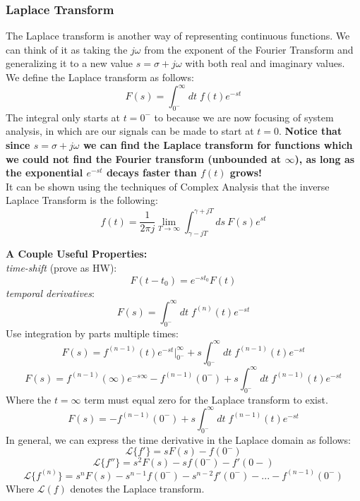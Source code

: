 \documentclass[a4paper]{article}
\numberwithin{equation}{section}
\begin{document}
\subsubsection{Laplace Transform}
The Laplace transform is another way of representing continuous functions. We can think of it as taking the $j\omega$ from the exponent of the Fourier Transform and generalizing it to a new value $s=\sigma +j\omega$ with both real and imaginary values. We define the Laplace transform as follows:
\begin{equation}\boxed{
F(s)=\int_{0^-}^{\infty}dt\; f(t)e^{-st}}
\end{equation}
The integral only starts at $t=0^{-}$ to because we are now focusing of system analysis, in which are our signals can be made to start at $t=0$. \textbf{Notice that since $s=\sigma +j\omega$ we can find the Laplace transform for functions which we could not find the Fourier transform (unbounded at $\infty$), as long as the exponential $e^{-st}$ decays faster than $f(t)$ grows!} \\

It can be shown using the techniques of Complex Analysis that the inverse Laplace Transform is the following:
\begin{equation}\boxed{
f(t) = \frac{1}{2\pi j}\lim_{T\rightarrow \infty}\int_{\gamma-jT}^{\gamma+jT} ds\: F(s) e^{st}}
\end{equation}

\textbf{A Couple Useful Properties:}\\
\textit{time-shift} (prove as HW):
\begin{equation}
F(t-t_0)=e^{-st_0}F(t)
\end{equation}
\textit{temporal derivatives}:
\begin{equation}
F(s)=\int_{0^-}^{\infty} dt\; f^{(n)}(t)e^{-st}
\end{equation}
Use integration by parts multiple times:
\begin{equation}
F(s)=f^{(n-1)}(t)e^{-st}\Big|_{0^-}^{\infty}+s\int_{0^-}^{\infty} dt\; f^{(n-1)}(t)e^{-st}
\end{equation}
\begin{equation}
F(s)=f^{(n-1)}(\infty)e^{-s\infty}-f^{(n-1)}(0^-)+s\int_{0^-}^{\infty} dt\; f^{(n-1)}(t)e^{-st}
\end{equation}
Where the $t=\infty$ term must equal zero for the Laplace transform to exist.
\begin{equation}
F(s)=-f^{(n-1)}(0^-)+s\int_{0^-}^{\infty} dt\; f^{(n-1)}(t)e^{-st}
\end{equation}
In general, we can express the time derivative in the Laplace domain as follows:
\begin{equation}
\mathcal{L}\{f'\}=sF(s)-f(0^-)
\end{equation}
\begin{equation}
\mathcal{L}\{f''\}=s^2F(s)-sf(0^-)-f'(0-)
\end{equation}
\begin{equation}
\mathcal{L}\{f^{(n)}\}=s^nF(s)-s^{n-1}f(0^-)-s^{n-2}f'(0^-)-...-f^{(n-1)}(0^-)
\end{equation}
Where $\mathcal{L}(f)$ denotes the Laplace transform.
\end{document}
